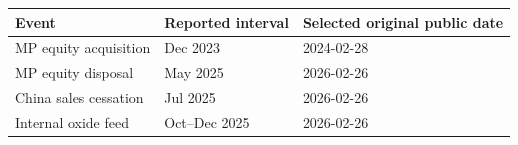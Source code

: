 \begin{tabular}{lll}\toprule
Event & Reported interval & Selected original public date \\\midrule
MP equity acquisition & Dec 2023 & 2024-02-28 \\
MP equity disposal & May 2025 & 2026-02-26 \\
China sales cessation & Jul 2025 & 2026-02-26 \\
Internal oxide feed & Oct--Dec 2025 & 2026-02-26 \\
\bottomrule\end{tabular}
